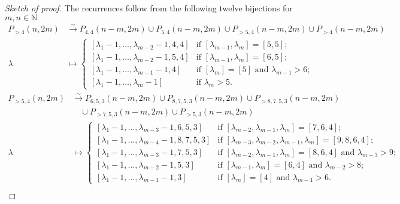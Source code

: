 \documentclass[a4paper, 12pt, reqno]{amsart}
\theoremstyle{remark}
\numberwithin{equation}{subsection}
\begin{document}
\begin{proof}[Sketch of proof]
  The recurrences follow from the following twelve bijections for $m, n \in \mathbb{N}$
  \begin{align*}
    P_{>4}(n, 2m) &\xrightarrow{\sim} P_{4, 4}(n - m, 2m) \cup P_{5, 4}(n - m, 2m) \cup P_{>5, 4}(n - m, 2m) \cup P_{>4}(n - m, 2m) \\
    \lambda &\mapsto
              \begin{cases}
                [\lambda_1 - 1, \dots, \lambda_{m - 2} - 1, 4, 4] &\text{if }[\lambda_{m - 1}, \lambda_m] = [5, 5]; \\
                [\lambda_1 - 1, \dots, \lambda_{m - 2} - 1, 5, 4] &\text{if }[\lambda_{m - 1}, \lambda_m] = [6, 5]; \\
                [\lambda_1 - 1, \dots, \lambda_{m - 1} - 1, 4] &\text{if }[\lambda_m] = [5]\text{ and }\lambda_{m - 1} > 6; \\
                [\lambda_1 - 1, \dots, \lambda_m - 1] &\text{if }\lambda_m > 5.
              \end{cases}
  \end{align*}
  \begin{align*}
    P_{>5, 4}(n, 2m) &\xrightarrow{\sim} P_{6, 5, 3}(n - m, 2m) \cup P_{8, 7, 5, 3}(n - m, 2m) \cup P_{>8, 7, 5, 3}(n - m, 2m)\\
    &\quad \cup P_{>7, 5, 3}(n - m, 2m) \cup P_{>5, 3}(n - m, 2m) \\
    \lambda &\mapsto
              \begin{cases}
                [\lambda_1 - 1, \dots, \lambda_{m - 3} - 1, 6, 5, 3] &\text{if }[\lambda_{m - 2}, \lambda_{m - 1}, \lambda_m] = [7, 6, 4]; \\
                [\lambda_1 - 1, \dots, \lambda_{m - 4} - 1, 8, 7, 5, 3] &\text{if }[\lambda_{m - 3}, \lambda_{m - 2}, \lambda_{m - 1}, \lambda_m] = [9, 8, 6, 4]; \\
                [\lambda_1 - 1, \dots, \lambda_{m - 3} - 1, 7, 5, 3] &\text{if }[\lambda_{m - 2}, \lambda_{m - 1}, \lambda_m] = [8, 6, 4]\text{ and }\lambda_{m - 3} > 9; \\
                [\lambda_1 - 1, \dots, \lambda_{m - 2} - 1, 5, 3] &\text{if }[\lambda_{m - 1}, \lambda_m] = [6, 4]\text{ and }\lambda_{m - 2} > 8; \\
                [\lambda_1 - 1, \dots, \lambda_{m - 1} -1, 3] &\text{if }[\lambda_m] = [4]\text{ and }\lambda_{m - 1} > 6.
              \end{cases}
  \end{align*}
  \begin{align*}

\end{align*}
\end{proof}
\end{document}
